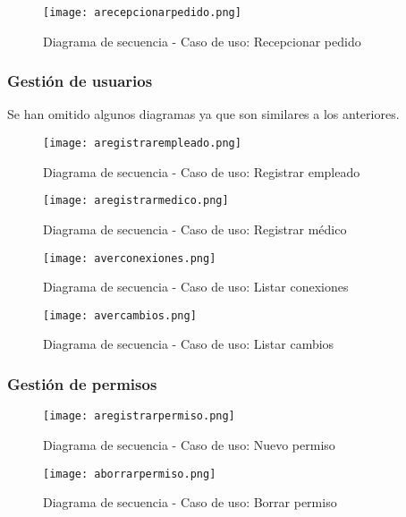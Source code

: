 \begin{figure}[!htb]
  \centering
    \texttt{[image: arecepcionarpedido.png]}
  \caption{Diagrama de secuencia - Caso de uso: Recepcionar pedido }
  \label{a}
\end{figure}

\subsubsection{Gestión de usuarios}
Se han omitido algunos diagramas ya que son similares a los anteriores.

\begin{figure}[!htb]
  \centering
    \texttt{[image: aregistrarempleado.png]}
  \caption{Diagrama de secuencia - Caso de uso: Registrar empleado  }
  \label{a}
\end{figure}

\begin{figure}[!htb]
  \centering
    \texttt{[image: aregistrarmedico.png]}
  \caption{Diagrama de secuencia - Caso de uso: Registrar médico   }
  \label{a}
\end{figure}

\begin{figure}[!htb]
  \centering
    \texttt{[image: averconexiones.png]}
  \caption{Diagrama de secuencia - Caso de uso: Listar conexiones   }
  \label{a}
\end{figure}

\begin{figure}[!htb]
  \centering
    \texttt{[image: avercambios.png]}
  \caption{Diagrama de secuencia - Caso de uso: Listar cambios  }
  \label{a}
\end{figure}
 
\clearpage
\subsubsection{Gestión de permisos}
\begin{figure}[!htb]
  \centering
    \texttt{[image: aregistrarpermiso.png]}
  \caption{Diagrama de secuencia - Caso de uso: Nuevo permiso }
  \label{a}
\end{figure}

\begin{figure}[!htb]
  \centering
    \texttt{[image: aborrarpermiso.png]}
  \caption{Diagrama de secuencia - Caso de uso: Borrar permiso }
  \label{a}
\end{figure}

